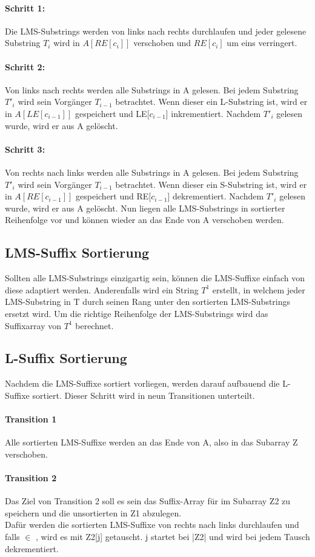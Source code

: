 \paragraph{Schritt 1:}
Die LMS-Substrings werden von links nach rechts durchlaufen und jeder gelesene Substring $T_{i}$ wird in $A[RE[c_{i}]]$ verschoben und $RE[c_{i}]$ um eins verringert.
\paragraph{Schritt 2:}
Von links nach rechts werden alle Substrings in A gelesen. Bei jedem Substring $T'_{i}$ wird sein Vorgänger $T_{i-1}$ betrachtet. Wenn dieser ein L-Substring ist, wird er in $A[LE[c_{i-1}]]$ gespeichert und LE[$c_{i-1}$] inkrementiert. Nachdem $T'_{i}$ gelesen wurde, wird er aus A gelöscht.
\paragraph{Schritt 3:}
Von rechts nach links werden alle Substrings in A gelesen. Bei jedem Substring $T'_{i}$ wird sein Vorgänger $T_{i-1}$ betrachtet. Wenn dieser ein S-Substring ist, wird er in $A[RE[c_{i-1}]]$ gespeichert und RE[$c_{i-1}$] dekrementiert. Nachdem $T'_{i}$ gelesen wurde, wird er aus A gelöscht.
\bigskip
Nun liegen alle LMS-Substrings in sortierter Reihenfolge vor und können wieder an das Ende von A verschoben werden.
\subsection{LMS-Suffix Sortierung}
Sollten alle LMS-Substrings einzigartig sein, können die LMS-Suffixe einfach von diese adaptiert werden.
Anderenfalls wird ein String $T^{1}$ erstellt, in welchem jeder LMS-Substring in T durch seinen Rang unter den sortierten LMS-Substrings ersetzt wird. Um die richtige Reihenfolge der LMS-Substrings wird das Suffixarray von $T^{1}$ berechnet.
\subsection{L-Suffix Sortierung}
Nachdem die LMS-Suffixe sortiert vorliegen, werden darauf aufbauend die L-Suffixe sortiert. Dieser Schritt wird in neun Transitionen unterteilt.
\paragraph{Transition 1}
Alle sortierten LMS-Suffixe werden an das Ende von A, also in das Subarray Z verschoben.
\paragraph{Transition 2}
Das Ziel von Transition 2 soll es sein das Suffix-Array für \lmsxnot  im Subarray Z2 zu speichern und die unsortierten \lmsx  in Z1 abzulegen.\\
Dafür werden die sortierten LMS-Suffixe von rechts nach links durchlaufen und falls \SAlms [i] $\in$ \lmsxnot , wird es mit Z2[j] getauscht. j startet bei |Z2| und wird bei jedem Tausch dekrementiert.
